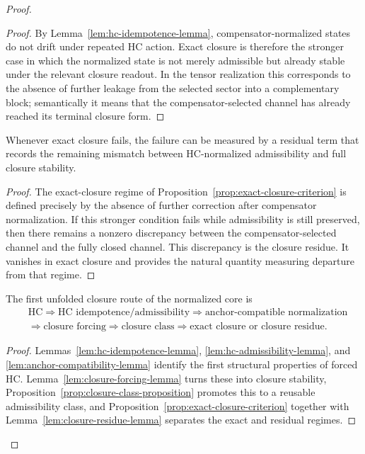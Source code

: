 \begin{proof}
\begin{proof}
By Lemma~\ref{lem:hc-idempotence-lemma}, compensator-normalized states do not
drift under repeated HC action. Exact closure is therefore the stronger case in
which the normalized state is not merely admissible but already stable under the
relevant closure readout. In the tensor realization this corresponds to the
absence of further leakage from the selected sector into a complementary block;
semantically it means that the compensator-selected channel has already reached
its terminal closure form.
\end{proof}

\begin{lemma}
\label{lem:closure-residue-lemma}
Whenever exact closure fails, the failure can be measured by a residual term
that records the remaining mismatch between HC-normalized admissibility and full
closure stability.
\end{lemma}

\begin{proof}
The exact-closure regime of
Proposition~\ref{prop:exact-closure-criterion} is defined precisely by the
absence of further correction after compensator normalization. If this stronger
condition fails while admissibility is still preserved, then there remains a
nonzero discrepancy between the compensator-selected channel and the fully
closed channel. This discrepancy is the closure residue. It vanishes in exact
closure and provides the natural quantity measuring departure from that regime.
\end{proof}

\begin{corollary}
\label{cor:first-closure-forcing-chain}
The first unfolded closure route of the normalized core is
\[
\begin{aligned}
&\mathrm{HC} \Longrightarrow \text{HC idempotence/admissibility} \Longrightarrow \text{anchor-compatible normalization}\\
&\Longrightarrow \text{closure forcing} \Longrightarrow \text{closure class} \Longrightarrow \text{exact closure or closure residue}.
\end{aligned}
\]
\end{corollary}

\begin{proof}
Lemmas~\ref{lem:hc-idempotence-lemma},
\ref{lem:hc-admissibility-lemma}, and
\ref{lem:anchor-compatibility-lemma} identify the first structural properties of
forced HC. Lemma~\ref{lem:closure-forcing-lemma} turns these into closure
stability, Proposition~\ref{prop:closure-class-proposition} promotes this to a
reusable admissibility class, and
Proposition~\ref{prop:exact-closure-criterion} together with
Lemma~\ref{lem:closure-residue-lemma} separates the exact and residual regimes.
\end{proof}



\end{proof}
